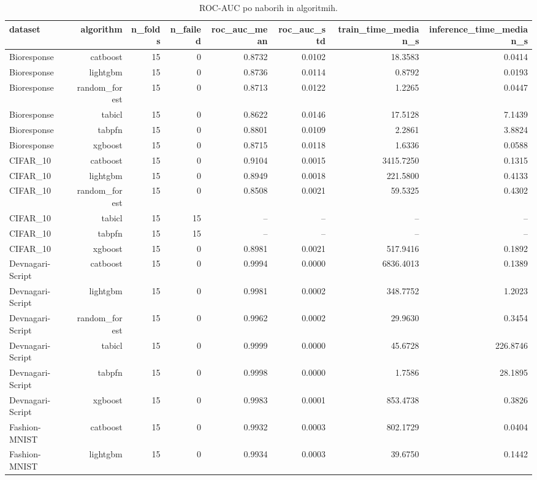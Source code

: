\begin{table}[htbp]
\centering
\caption{ROC-AUC po naborih in algoritmih.}
\label{tab:per-dataset}
\begin{tabular}{lrrrrrrr}
\hline
dataset & algorithm & n\_folds & n\_failed & roc\_auc\_mean & roc\_auc\_std & train\_time\_median\_s & inference\_time\_median\_s \\
\hline
Bioresponse & catboost & 15 & 0 & 0.8732 & 0.0102 & 18.3583 & 0.0414 \\
Bioresponse & lightgbm & 15 & 0 & 0.8736 & 0.0114 & 0.8792 & 0.0193 \\
Bioresponse & random\_forest & 15 & 0 & 0.8713 & 0.0122 & 1.2265 & 0.0447 \\
Bioresponse & tabicl & 15 & 0 & 0.8622 & 0.0146 & 17.5128 & 7.1439 \\
Bioresponse & tabpfn & 15 & 0 & 0.8801 & 0.0109 & 2.2861 & 3.8824 \\
Bioresponse & xgboost & 15 & 0 & 0.8715 & 0.0118 & 1.6336 & 0.0588 \\
CIFAR\_10 & catboost & 15 & 0 & 0.9104 & 0.0015 & 3415.7250 & 0.1315 \\
CIFAR\_10 & lightgbm & 15 & 0 & 0.8949 & 0.0018 & 221.5800 & 0.4133 \\
CIFAR\_10 & random\_forest & 15 & 0 & 0.8508 & 0.0021 & 59.5325 & 0.4302 \\
CIFAR\_10 & tabicl & 15 & 15 & -- & -- & -- & -- \\
CIFAR\_10 & tabpfn & 15 & 15 & -- & -- & -- & -- \\
CIFAR\_10 & xgboost & 15 & 0 & 0.8981 & 0.0021 & 517.9416 & 0.1892 \\
Devnagari-Script & catboost & 15 & 0 & 0.9994 & 0.0000 & 6836.4013 & 0.1389 \\
Devnagari-Script & lightgbm & 15 & 0 & 0.9981 & 0.0002 & 348.7752 & 1.2023 \\
Devnagari-Script & random\_forest & 15 & 0 & 0.9962 & 0.0002 & 29.9630 & 0.3454 \\
Devnagari-Script & tabicl & 15 & 0 & 0.9999 & 0.0000 & 45.6728 & 226.8746 \\
Devnagari-Script & tabpfn & 15 & 0 & 0.9998 & 0.0000 & 1.7586 & 28.1895 \\
Devnagari-Script & xgboost & 15 & 0 & 0.9983 & 0.0001 & 853.4738 & 0.3826 \\
Fashion-MNIST & catboost & 15 & 0 & 0.9932 & 0.0003 & 802.1729 & 0.0404 \\
Fashion-MNIST & lightgbm & 15 & 0 & 0.9934 & 0.0003 & 39.6750 & 0.1442 \\

\end{tabular}
\end{table}
